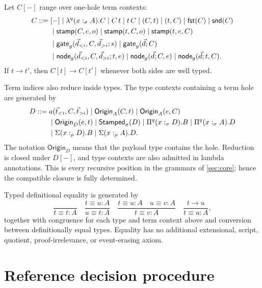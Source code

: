 \documentclass[11pt]{article}
\numberwithin{equation}{section}
\theoremstyle{definition}
\theoremstyle{plain}
\theoremstyle{remark}
\newcommand{\Origin}{\mathsf{Origin}}
\newcommand{\Stamped}{\mathsf{Stamped}}
\newcommand{\jdeq}{\equiv}
\newcommand{\fst}{\AFFst}
\newcommand{\snd}{\AFSnd}
\begin{document}
Let \(C[-]\) range over one-hole term contexts:
\begin{align*}
C ::={}&[-]
 \mid \lambda^q(x:_{\sigma}A).C
 \mid C\,t\mid t\,C
 \mid(C,t)\mid(t,C)
 \mid\fst(C)\mid\snd(C)\\
 &\mid\mathsf{stamp}(C,e,o)
 \mid\mathsf{stamp}(t,C,o)
 \mid\mathsf{stamp}(t,e,C)\\
 &\mid\mathsf{gate}_g(\vec d_{<i},C,\vec d_{>i};s)
 \mid\mathsf{gate}_g(\vec d;C)\\
 &\mid\mathsf{node}_g(\vec d_{<i},C,\vec d_{>i};t,e)
 \mid\mathsf{node}_g(\vec d;C,e)
 \mid\mathsf{node}_g(\vec d;t,C).
\end{align*}
If \(t\longrightarrow t'\), then
\(C[t]\longrightarrow C[t']\) whenever both sides are well typed.

Term indices also reduce inside types.  The type contexts containing a term
hole are generated by
\begin{align*}
D ::={}&a(\vec t_{<i},C,\vec t_{>i})
 \mid\Origin_A(C,t)\mid\Origin_A(e,C)\\
 &\mid\Origin_D(e,t)
 \mid\Stamped_\sigma(D)
 \mid\AFDepFun^q(x:_{\sigma}D).B
 \mid\AFDepFun^q(x:_{\sigma}A).D\\
 &\mid\AFDepPair(x:_{\rho}D).B
 \mid\AFDepPair(x:_{\rho}A).D.
\end{align*}
The notation \(\Origin_D\) means that the payload type contains the hole.
Reduction is closed under \(D[-]\), and type contexts are also admitted in
lambda annotations.  This is every recursive position in the grammars of
\cref{sec:core}; hence the compatible closure is fully determined.

Typed definitional equality is generated by
\[
\frac{}{t\jdeq t:A}
\quad
\frac{t\jdeq u:A}{u\jdeq t:A}
\quad
\frac{t\jdeq u:A\quad u\jdeq v:A}{t\jdeq v:A}
\quad
\frac{t\longrightarrow u}{t\jdeq u:A},
\]
together with congruence for each type and term context above and conversion
between definitionally equal types.  Equality has no additional extensional,
script, quotient, proof-irrelevance, or event-erasing axiom.

\section{Reference decision procedure}\label{app:checker}
\end{document}
